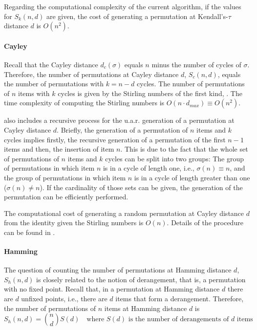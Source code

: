 \documentclass[article,nojss]{jss}
\begin{document}
Regarding the computational complexity of the current algorithm, if the values for $S_k(n,d)$ are given, the cost of generating a permutation at Kendall's-$\tau$ distance $d$ is $O(n^2)$.

\paragraph{Cayley}
Recall that the Cayley distance $d_c(\sigma)$ equals $n$ minus the number of cycles of $\sigma$. Therefore, the number of permutations at Cayley distance $d$, $S_c(n,d)$,  equals the number of permutations with $k=n-d$ cycles. The number of permutations of $n$ items with $k$ cycles is given by the Stirling numbers of the first kind, \cite{Sloane_cayley}. The time complexity of computing the Stirling numbers is $O(n \cdot d_{max}) \equiv O(n^2)$. 

 also includes a recursive process for the u.a.r. generation of a permutation at Cayley distance $d$. Briefly, the generation of a permutation of $n$ items and $k$ cycles implies firstly, the recursive generation of a permutation of the first $n-1$ items and then, the insertion of item $n$. This is due to the fact that the whole set of permutations of $n$ items and $k$ cycles can be split into two groups: The group of permutations in which item $n$ is in a cycle of length one, i.e., $\sigma(n)\equiv n$, and the group of permutations in which item $n$ is in a cycle of length greater than one ($\sigma(n) \neq n$). If the cardinality of those sets can be given, the generation of the permutation can be efficiently performed. 

The computational cost of generating a random permutation at Cayley distance $d$ from the identity given the Stirling numbers is $O(n)$. Details of the procedure can be found in \cite{Irurozki2014b}. 

\paragraph{Hamming}
The question of counting the number of permutations at Hamming distance $d$, $S_h(n,d)$ is closely related to the notion of derangement, that is, a permutation with no fixed point. Recall that, in a permutation at Hamming distance $d$ there are $d$ unfixed points, i.e., there are $d$ items that form a derangement. Therefore, the number of permutations of $n$ items at Hamming distance $d$ is
\[	S_h(n,d) = \binom{n}{d}S(d) \quad \text{where $S(d)$ is the number of derangements of $d$ items}	\]
\end{document}
